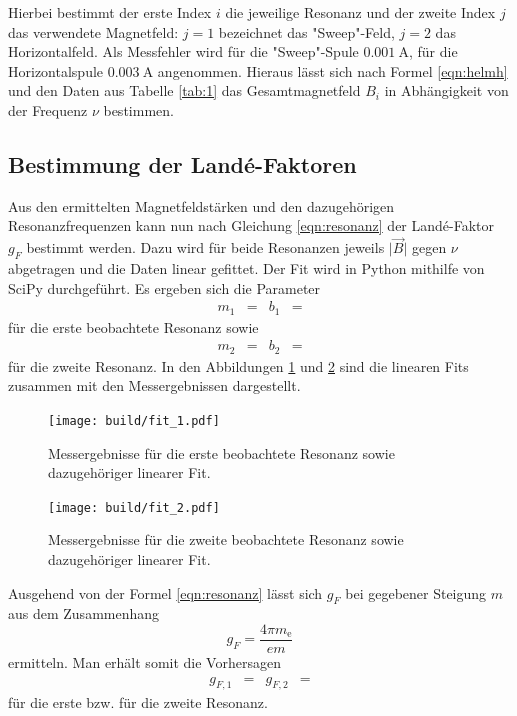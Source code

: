 Hierbei bestimmt der erste Index $i$ die jeweilige Resonanz und der zweite Index $j$ das verwendete Magnetfeld: $j=1$ bezeichnet das "Sweep"-Feld, $j=2$ das Horizontalfeld.
Als Messfehler wird für die "Sweep"-Spule $\SI{0.001}{\ampere}$, für die Horizontalspule $\SI{0.003}{\ampere}$ angenommen.
Hieraus lässt sich nach Formel \eqref{eqn:helmh} und den Daten aus Tabelle \ref{tab:1} das Gesamtmagnetfeld $B_i$ in Abhängigkeit von der Frequenz $\nu$ bestimmen.

\subsection{Bestimmung der Land\'{e}-Faktoren}
Aus den ermittelten Magnetfeldstärken und den dazugehörigen Resonanzfrequenzen kann nun nach Gleichung \ref{eqn:resonanz} der Land\'{e}-Faktor $g_F$ bestimmt werden.
Dazu wird für beide Resonanzen jeweils $\lvert \vec{B} \rvert$ gegen $\nu$ abgetragen und die Daten linear gefittet.
Der Fit wird in Python mithilfe von SciPy durchgeführt.
Es ergeben sich die Parameter
\begin{align*}
  m_1 &=  & b_1 &= 
\end{align*}
für die erste beobachtete Resonanz sowie
\begin{align*}
  m_2 &=  & b_2 &= 
\end{align*}
für die zweite Resonanz.
In den Abbildungen \ref{plot:1} und \ref{plot:2} sind die linearen Fits zusammen mit den Messergebnissen dargestellt.
\begin{figure}
  \centering
  \texttt{[image: build/fit\_1.pdf]}
  \caption{Messergebnisse für die erste beobachtete Resonanz sowie dazugehöriger linearer Fit.}
  \label{plot:1}
\end{figure}

\begin{figure}
  \centering
  \texttt{[image: build/fit\_2.pdf]}
  \caption{Messergebnisse für die zweite beobachtete Resonanz sowie dazugehöriger linearer Fit.}
  \label{plot:2}
\end{figure}

Ausgehend von der Formel \ref{eqn:resonanz} lässt sich $g_F$ bei gegebener Steigung $m$ aus dem Zusammenhang
\begin{equation}
  g_F = \frac{4 \pi m_\text{e}}{e m}
\end{equation}
ermitteln.
Man erhält somit die Vorhersagen
\begin{align*}
  g_{F,1} &=  & g_{F,2} &= 
\end{align*}
für die erste bzw. für die zweite Resonanz.

